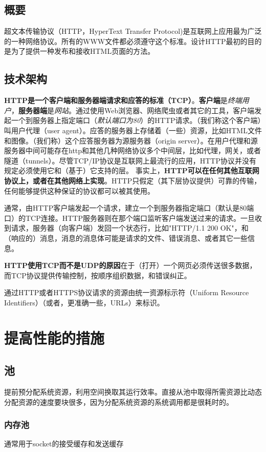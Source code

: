 \documentclass[UTF8,a4paper,12pt]{ctexbook}
\begin{document}
		\subsection{概要}
			超文本传输协议（HTTP，HyperText Transfer Protocol)是互联网上应用最为广泛的一种网络协议。所有的WWW文件都必须遵守这个标准。设计HTTP最初的目的是为了提供一种发布和接收HTML页面的方法。
		
		\subsection{技术架构}
			\textbf{HTTP是一个客户端和服务器端请求和应答的标准（TCP）}。\textbf{客户端}是\textit{终端用户}，\textbf{服务器端}是\textit{网站}。通过使用Web浏览器、网络爬虫或者其它的工具，客户端发起一个到服务器上指定端口（\textit{默认端口为80}）的HTTP请求。（我们称这个客户端）叫用户代理（user agent）。应答的服务器上存储着（一些）资源，比如HTML文件和图像。（我们称）这个应答服务器为源服务器（origin server）。在用户代理和源服务器中间可能存在http和其他几种网络协议多个中间层，比如代理，网关，或者隧道（tunnels）。尽管TCP/IP协议是互联网上最流行的应用，HTTP协议并没有规定必须使用它和（基于）它支持的层。 事实上，\textbf{HTTP可以在任何其他互联网协议上，或者在其他网络上实现}。HTTP只假定（其下层协议提供）可靠的传输，任何能够提供这种保证的协议都可以被其使用。
			
			通常，由HTTP客户端发起一个请求，建立一个到服务器指定端口（默认是80端口）的TCP连接。HTTP服务器则在那个端口监听客户端发送过来的请求。一旦收到请求，服务器（向客户端）发回一个状态行，比如"HTTP/1.1 200 OK"，和（响应的）消息，消息的消息体可能是请求的文件、错误消息、或者其它一些信息。

			\textbf{HTTP使用TCP而不是UDP的原因}在于（打开）一个网页必须传送很多数据，而TCP协议提供传输控制，按顺序组织数据，和错误纠正。
			
			通过HTTP或者HTTPS协议请求的资源由统一资源标示符（Uniform Resource Identifiers）（或者，更准确一些，URLs）来标识。
	\section{提高性能的措施}
		\subsection{池}
			提前预分配系统资源，利用空间换取其运行效率。直接从池中取得所需资源比动态分配资源的速度要块很多，因为分配系统资源的系统调用都是很耗时的。
			\subsubsection{内存池}
				通常用于socket的接受缓存和发送缓存
				
\end{document}
